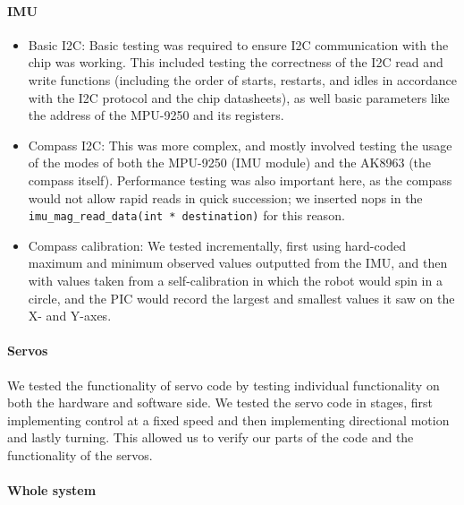 \documentclass[]{article}
\providecommand{\tightlist}{%
  \setlength{\itemsep}{0pt}\setlength{\parskip}{0pt}}
\let\oldparagraph\paragraph
\renewcommand{\paragraph}[1]{\oldparagraph{#1}\mbox{}}
\begin{document}
\hypertarget{imu-1}{%
\paragraph{IMU}\label{imu-1}}

\begin{itemize}
\tightlist
\item
  Basic I2C: Basic testing was required to ensure I2C communication with
  the chip was working. This included testing the correctness of the I2C
  read and write functions (including the order of starts, restarts, and
  idles in accordance with the I2C protocol and the chip datasheets), as
  well basic parameters like the address of the MPU-9250 and its
  registers.
\item
  Compass I2C: This was more complex, and mostly involved testing the
  usage of the modes of both the MPU-9250 (IMU module) and the AK8963
  (the compass itself). Performance testing was also important here, as
  the compass would not allow rapid reads in quick succession; we
  inserted nops in the
  \texttt{imu\_mag\_read\_data(int\ *\ destination)} for this reason.
\item
  Compass calibration: We tested incrementally, first using hard-coded
  maximum and minimum observed values outputted from the IMU, and then
  with values taken from a self-calibration in which the robot would
  spin in a circle, and the PIC would record the largest and smallest
  values it saw on the X- and Y-axes.
\end{itemize}

\hypertarget{servos-1}{%
\paragraph{Servos}\label{servos-1}}

We tested the functionality of servo code by testing individual
functionality on both the hardware and software side. We tested the
servo code in stages, first implementing control at a fixed speed and
then implementing directional motion and lastly turning. This allowed us
to verify our parts of the code and the functionality of the servos.

\hypertarget{whole-system}{%
\paragraph{Whole system}\label{whole-system}}
\end{document}
